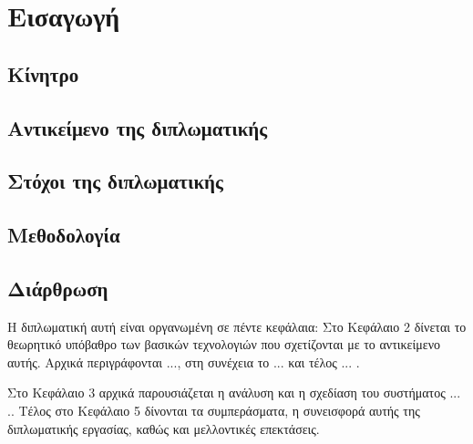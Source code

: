 \chapter{Εισαγωγή}

\section{Κίνητρο}


\section{Αντικείμενο της διπλωματικής}


\section{Στόχοι της διπλωματικής}


\section{Μεθοδολογία}

\section{Διάρθρωση}
Η διπλωματική αυτή είναι οργανωμένη σε πέντε κεφάλαια: Στο Κεφάλαιο 2
δίνεται το θεωρητικό υπόβαθρο των βασικών τεχνολογιών που
σχετίζονται με το αντικείμενο αυτής.
Αρχικά περιγράφονται ..., στη συνέχεια το ... και τέλος ... . 

Στο Κεφάλαιο 3 αρχικά παρουσιάζεται η ανάλυση και η σχεδίαση του συστήματος ... .. 
Τέλος στο Κεφάλαιο 5 δίνονται τα συμπεράσματα, η συνεισφορά αυτής της
διπλωματικής εργασίας, καθώς και μελλοντικές επεκτάσεις.
